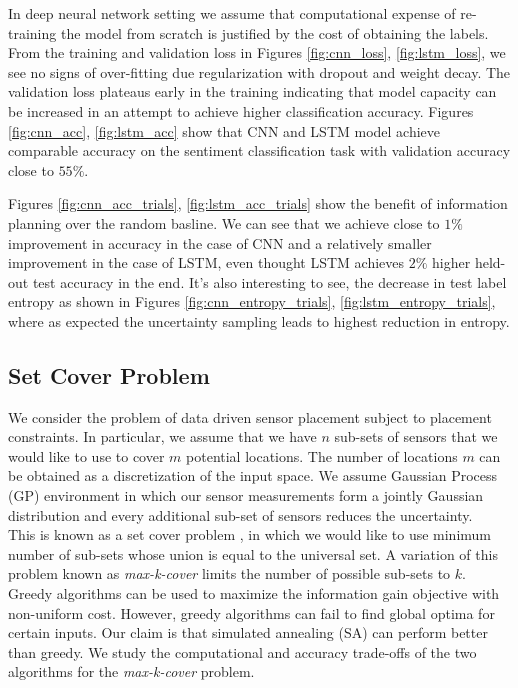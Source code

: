 In deep neural network setting we assume that computational expense of re-training the model from scratch is justified by the cost of obtaining the labels. From the training and validation loss in Figures \ref{fig:cnn_loss}, \ref{fig:lstm_loss}, we see no signs of over-fitting due regularization with dropout and weight decay. The validation loss plateaus early in the training indicating that model capacity can be increased in an attempt to achieve higher classification accuracy. Figures \ref{fig:cnn_acc}, \ref{fig:lstm_acc} show that CNN and LSTM model achieve comparable accuracy on the sentiment classification task with validation accuracy close to $55\%$.     

Figures \ref{fig:cnn_acc_trials}, \ref{fig:lstm_acc_trials} show the benefit of information planning over the random basline. We can see that we achieve close to $1\%$ improvement in accuracy in the case of CNN and a relatively smaller improvement in the case of LSTM, even thought LSTM achieves $2\%$ higher held-out test accuracy in the end. It's also interesting to see, the decrease in test label entropy as shown in Figures \ref{fig:cnn_entropy_trials}, \ref{fig:lstm_entropy_trials}, where as expected the uncertainty sampling leads to highest reduction in entropy. 

\subsection{Set Cover Problem}

We consider the problem of data driven sensor placement subject to placement constraints. In particular, we assume that we have $n$ sub-sets of sensors that we would like to use to cover
$m$ potential locations. The number of locations $m$ can be obtained as a discretization of the input space. We assume Gaussian Process (GP) environment in which our sensor measurements form a jointly Gaussian distribution and every additional sub-set of sensors reduces the uncertainty.\\

This is known as a set cover problem \cite{SkienaBook}, in which we would like to use minimum number of sub-sets whose union is equal to the universal set. A variation of this problem known as \textit{max-k-cover} limits the number of possible sub-sets to $k$.\\

Greedy algorithms can be used to maximize the information gain objective with non-uniform cost\cite{Kraus2008}. However, greedy algorithms can fail to find global optima for certain inputs. Our claim is that simulated annealing (SA) can perform better than greedy. We study the computational and accuracy trade-offs of the two algorithms for the \textit{max-k-cover} problem. 

